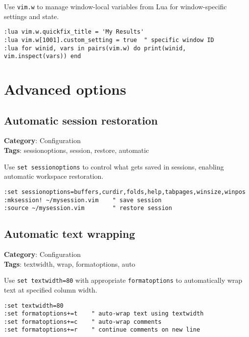 Use {\footnotesize \Verb§vim.w§} to manage window-local variables from Lua for window-specific settings and state.

\begin{Exa*}{}
\begin{Verbatim}[fontsize=\footnotesize, breaklines, breakanywhere]
:lua vim.w.quickfix_title = 'My Results'
:lua vim.w[1001].custom_setting = true  " specific window ID
:lua for winid, vars in pairs(vim.w) do print(winid, vim.inspect(vars)) end
\end{Verbatim}
\end{Exa*}

\chapter{Advanced options}
\section{Automatic session restoration}

\textbf{Category}: Configuration\\ \textbf{Tags}: sessionoptions, session, restore, automatic
\vspace{0.5cm}

Use {\footnotesize \Verb§set sessionoptions§} to control what gets saved in sessions, enabling automatic workspace restoration.

\begin{Exa*}{}
\begin{Verbatim}[fontsize=\footnotesize, breaklines, breakanywhere]
:set sessionoptions=buffers,curdir,folds,help,tabpages,winsize,winpos
:mksession! ~/mysession.vim    " save session
:source ~/mysession.vim        " restore session
\end{Verbatim}
\end{Exa*}

\section{Automatic text wrapping}

\textbf{Category}: Configuration\\ \textbf{Tags}: textwidth, wrap, formatoptions, auto
\vspace{0.5cm}

Use {\footnotesize \Verb§set textwidth=80§} with appropriate {\footnotesize \Verb§formatoptions§} to automatically wrap text at specified column width.

\begin{Exa*}{}
\begin{Verbatim}[fontsize=\footnotesize, breaklines, breakanywhere]
:set textwidth=80
:set formatoptions+=t    " auto-wrap text using textwidth
:set formatoptions+=c    " auto-wrap comments
:set formatoptions+=r    " continue comments on new line
\end{Verbatim}
\end{Exa*}


